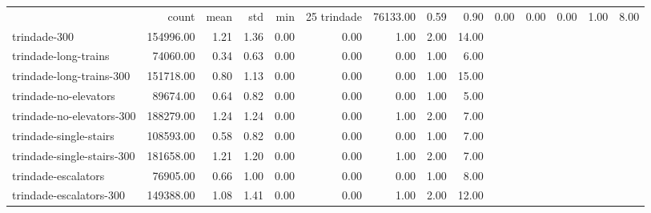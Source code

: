 \begin{tabular}{lrrrrrrrr}
 & count & mean & std & min & 25%
trindade & 76133.00 & 0.59 & 0.90 & 0.00 & 0.00 & 0.00 & 1.00 & 8.00 \\
trindade-300 & 154996.00 & 1.21 & 1.36 & 0.00 & 0.00 & 1.00 & 2.00 & 14.00 \\
trindade-long-trains & 74060.00 & 0.34 & 0.63 & 0.00 & 0.00 & 0.00 & 1.00 & 6.00 \\
trindade-long-trains-300 & 151718.00 & 0.80 & 1.13 & 0.00 & 0.00 & 0.00 & 1.00 & 15.00 \\
trindade-no-elevators & 89674.00 & 0.64 & 0.82 & 0.00 & 0.00 & 0.00 & 1.00 & 5.00 \\
trindade-no-elevators-300 & 188279.00 & 1.24 & 1.24 & 0.00 & 0.00 & 1.00 & 2.00 & 7.00 \\
trindade-single-stairs & 108593.00 & 0.58 & 0.82 & 0.00 & 0.00 & 0.00 & 1.00 & 7.00 \\
trindade-single-stairs-300 & 181658.00 & 1.21 & 1.20 & 0.00 & 0.00 & 1.00 & 2.00 & 7.00 \\
trindade-escalators & 76905.00 & 0.66 & 1.00 & 0.00 & 0.00 & 0.00 & 1.00 & 8.00 \\
trindade-escalators-300 & 149388.00 & 1.08 & 1.41 & 0.00 & 0.00 & 1.00 & 2.00 & 12.00 \\
\end{tabular}
